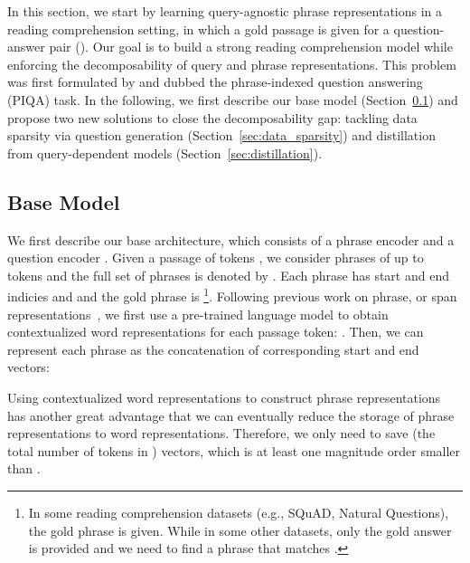 \documentclass[11pt,a4paper]{article}
\begin{document}
In this section, we start by learning query-agnostic phrase representations in a reading comprehension setting, in which a gold passage  is given for a question-answer pair (). Our goal is to build a strong reading comprehension model while enforcing the decomposability of query and phrase representations. This problem was first formulated by  and dubbed the phrase-indexed question answering (PIQA) task. In the following, we first describe our base model (Section~\ref{sec:base_model}) and propose two new solutions to close the decomposability gap: tackling data sparsity via question generation (Section~\ref{sec:data_sparsity}) and distillation from query-dependent models (Section~\ref{sec:distillation}).



















\subsection{Base Model}\label{sec:base_model}




We first describe our base architecture, which consists of a phrase encoder  and a question encoder . Given a passage  of  tokens , we consider phrases of up to  tokens and the full set of phrases is denoted by . Each phrase  has start and end indicies  and  and the gold phrase is \footnote{In some reading comprehension datasets (e.g., SQuAD, Natural Questions), the gold phrase  is given. While in some other datasets, only the gold answer  is provided and we need to find a phrase  that matches . }.
Following previous work on phrase, or span representations~\citep{lee2017learning,seo2018phrase}, we first use a pre-trained language model  to obtain contextualized word representations for each passage token: . Then, we can represent each phrase  as the concatenation of corresponding start and end vectors:
\vspace{-0.5em}

Using contextualized word representations to construct phrase representations has another great advantage that we can eventually reduce the storage of phrase representations to word representations. Therefore, we only need to save  (the total number of tokens in ) vectors, which is at least one magnitude order smaller than .
\end{document}
